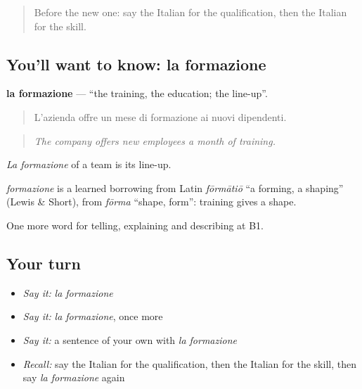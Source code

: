 \label{lesson:IT-C361-formazione}



\begin{quote}
Before the new one: say the Italian for the qualification, then the Italian for the skill.
\end{quote}

\subsection*{You'll want to know: la formazione}
\textbf{la formazione} — \textquotedblleft{}the training, the education; the line-up\textquotedblright{}.

\begin{quote}
L'azienda offre un mese di formazione ai nuovi dipendenti.
\end{quote}

\begin{quote}
\emph{The company offers new employees a month of training.}
\end{quote}

\emph{La formazione} of a team is its line-up.

\begin{cousinweb}
\emph{formazione} is a learned borrowing from Latin \emph{fōrmātiō} \textquotedblleft{}a forming, a shaping\textquotedblright{} (Lewis \& Short), from \emph{fōrma} \textquotedblleft{}shape, form\textquotedblright{}: training gives a shape.
\end{cousinweb}

\begin{grammarlens}[title={What you've built}]
One more word for telling, explaining and describing at B1.
\end{grammarlens}

\subsection*{Your turn}
\begin{itemize}
\raggedright
  \item \emph{Say it:} \emph{la formazione}
  \item \emph{Say it:} \emph{la formazione}, once more
  \item \emph{Say it:} a sentence of your own with \emph{la formazione}
  \item \emph{Recall:} say the Italian for the qualification, then the Italian for the skill, then say \emph{la formazione} again
\end{itemize}

